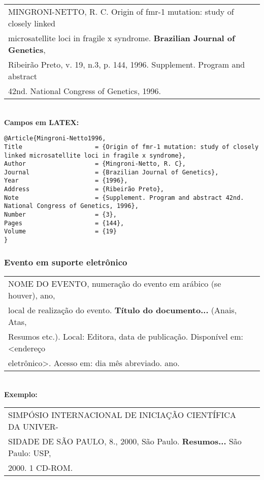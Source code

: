 \begin{tabular}{|l|c|} \hline
	MINGRONI-NETTO, R. C. Origin of fmr-1 mutation: study of closely linked \\microsatellite loci in fragile x syndrome. \textbf{Brazilian Journal of Genetics}, \\Ribeirão Preto, v. 19, n.3, p. 144, 1996. Supplement. Program and abstract \\42nd. National Congress of Genetics, 1996. 
	                                                                        \\\hline
\end{tabular} \\
	
\textbf{Campos em LATEX:} 
	
\begingroup
\fontsize{10pt}{12pt}\selectfont
\begin{verbatim}
@Article{Mingroni-Netto1996,
Title                    = {Origin of fmr-1 mutation: study of closely 
linked microsatellite loci in fragile x syndrome},
Author                   = {Mingroni-Netto, R. C},
Journal                  = {Brazilian Journal of Genetics},
Year                     = {1996},
Address                  = {Ribeirão Preto},
Note                     = {Supplement. Program and abstract 42nd. 
National Congress of Genetics, 1996},
Number                   = {3},
Pages                    = {144},
Volume                   = {19}
}\end{verbatim}
\endgroup
\subsubsection{Evento em suporte eletrônico} 

\begin{tabular}{|l|c|} \hline
	NOME DO EVENTO, numeração do evento em arábico (se
	houver), ano, \\local de realização do evento. \textbf{Título do
	documento...} (Anais, Atas, \\Resumos etc.). Local: Editora, data de publicação. Disponível em: <endereço \\eletrônico>. Acesso em: dia mês abreviado. ano. 
	\\\hline
\end{tabular} \\

\textbf{Exemplo:} \\

\begin{tabular}{|l|c|} \hline
	SIMPÓSIO INTERNACIONAL DE INICIAÇÃO CIENTÍFICA DA
	UNIVER-\\SIDADE DE SÃO PAULO, 8., 2000, São Paulo. \textbf{Resumos...}
	São Paulo: USP, \\2000. 1 CD-ROM.  \\\hline
\end{tabular} \\

